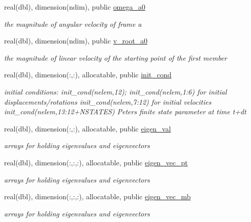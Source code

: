 \begin{DoxyCompactItemize}
real(dbl), dimension(ndim), public \hyperlink{namespaceioaero_a38fc5ef87ae7c2e312ad32f857e791cb}{omega\+\_\+a0}
\begin{DoxyCompactList}\small\item\em the magnitude of angular velocity of frame a \end{DoxyCompactList}\item 
real(dbl), dimension(ndim), public \hyperlink{namespaceioaero_a3cefdbd9d62bffe41f44b7f79f321f67}{v\+\_\+root\+\_\+a0}
\begin{DoxyCompactList}\small\item\em the magnitude of linear velocity of the starting point of the first member \end{DoxyCompactList}\item 
real(dbl), dimension(\+:,\+:), allocatable, public \hyperlink{namespaceioaero_ad88d83709eb2f4596a89098db11ba770}{init\+\_\+cond}
\begin{DoxyCompactList}\small\item\em initial conditions\+: init\+\_\+cond(nelem,12); init\+\_\+cond(nelem,1\+:6) for initial displacements/rotations init\+\_\+cond(nelem,7\+:12) for initial velocities init\+\_\+cond(nelem,13\+:12+\+N\+S\+T\+A\+T\+ES) Peters finite state parameter at time t+dt \end{DoxyCompactList}\item 
real(dbl), dimension(\+:,\+:), allocatable, public \hyperlink{namespaceioaero_ae043619051217506f070ece6f24deedf}{eigen\+\_\+val}
\begin{DoxyCompactList}\small\item\em arrays for holding eigenvalues and eigenvectors \end{DoxyCompactList}\item 
real(dbl), dimension(\+:,\+:,\+:), allocatable, public \hyperlink{namespaceioaero_a53e09660909f61713dee3887a3adc1ec}{eigen\+\_\+vec\+\_\+pt}
\begin{DoxyCompactList}\small\item\em arrays for holding eigenvalues and eigenvectors \end{DoxyCompactList}\item 
real(dbl), dimension(\+:,\+:,\+:), allocatable, public \hyperlink{namespaceioaero_a0d150f0b81c676515b90fcf83d7ff8c3}{eigen\+\_\+vec\+\_\+mb}
\begin{DoxyCompactList}\small\item\em arrays for holding eigenvalues and eigenvectors \end{DoxyCompactList}\item 

\end{DoxyCompactItemize}
